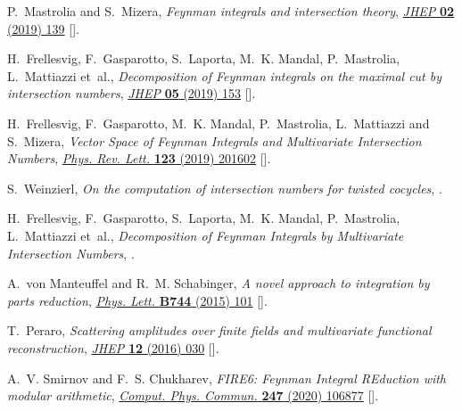 \documentclass[11pt,a4paper,DIV=11,numbers=noenddot,parskip=half]{scrartcl}
\begin{document}
\begin{thebibliography}{10}
P.~Mastrolia and S.~Mizera, \emph{{Feynman integrals and intersection theory}},
  \href{https://doi.org/10.1007/JHEP02(2019)139}{\emph{JHEP} {\bfseries 02}
  (2019) 139} [\href{https://arxiv.org/abs/1810.03818}{{}}].

H.~Frellesvig, F.~Gasparotto, S.~Laporta, M.~K. Mandal, P.~Mastrolia,
  L.~Mattiazzi et~al., \emph{{Decomposition of Feynman integrals on the maximal
  cut by intersection numbers}},
  \href{https://doi.org/10.1007/JHEP05(2019)153}{\emph{JHEP} {\bfseries 05}
  (2019) 153} [\href{https://arxiv.org/abs/1901.11510}{{}}].

H.~Frellesvig, F.~Gasparotto, M.~K. Mandal, P.~Mastrolia, L.~Mattiazzi and
  S.~Mizera, \emph{{Vector Space of Feynman Integrals and Multivariate
  Intersection Numbers}},
  \href{https://doi.org/10.1103/PhysRevLett.123.201602}{\emph{Phys. Rev. Lett.}
  {\bfseries 123} (2019) 201602}
  [\href{https://arxiv.org/abs/1907.02000}{{}}].

S.~Weinzierl, \emph{{On the computation of intersection numbers for twisted
  cocycles}},  \href{https://arxiv.org/abs/2002.01930}{{}}.

H.~Frellesvig, F.~Gasparotto, S.~Laporta, M.~K. Mandal, P.~Mastrolia,
  L.~Mattiazzi et~al., \emph{{Decomposition of Feynman Integrals by
  Multivariate Intersection Numbers}},
  \href{https://arxiv.org/abs/2008.04823}{{}}.

A.~von Manteuffel and R.~M. Schabinger, \emph{{A novel approach to integration
  by parts reduction}},
  \href{https://doi.org/10.1016/j.physletb.2015.03.029}{\emph{Phys. Lett.}
  {\bfseries B744} (2015) 101}
  [\href{https://arxiv.org/abs/1406.4513}{{}}].

T.~Peraro, \emph{{Scattering amplitudes over finite fields and multivariate
  functional reconstruction}},
  \href{https://doi.org/10.1007/JHEP12(2016)030}{\emph{JHEP} {\bfseries 12}
  (2016) 030} [\href{https://arxiv.org/abs/1608.01902}{{}}].

A.~V. Smirnov and F.~S. Chukharev, \emph{{FIRE6: Feynman Integral REduction
  with modular arithmetic}},
  \href{https://doi.org/10.1016/j.cpc.2019.106877}{\emph{Comput. Phys. Commun.}
  {\bfseries 247} (2020) 106877}
  [\href{https://arxiv.org/abs/1901.07808}{{}}].


\end{thebibliography}
\end{document}
